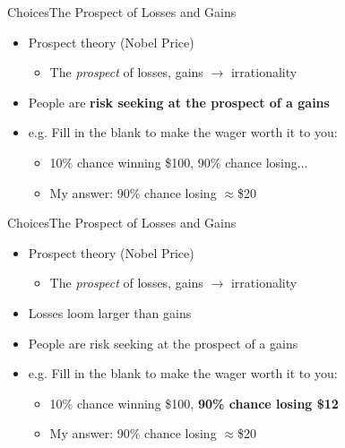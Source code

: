 \documentclass{beamer}
\begin{document}
\begin{frame}{Choices}{The Prospect of Losses and Gains}
  \begin{itemize}
  \addtolength{\itemsep}{0.5\baselineskip}
  \item Prospect theory (Nobel Price) 
        \begin{itemize}
        \item The {\it prospect} of losses, gains $\rightarrow$ irrationality
        \end{itemize}
  \item People are {\bf risk seeking at the prospect of a gains}
  \item e.g. Fill in the blank to make the wager worth it to you:
        \begin{itemize}
        \addtolength{\itemsep}{0.5\baselineskip}
        \item 10\% chance winning \$100, 90\% chance losing...
        \item My answer: 90\% chance losing $\approx$\$20
        \end{itemize}
  \end{itemize}

\end{frame}

\begin{frame}{Choices}{The Prospect of Losses and Gains}
  \begin{itemize}
  \addtolength{\itemsep}{0.5\baselineskip}
  \item Prospect theory (Nobel Price) 
        \begin{itemize}
        \item The {\it prospect} of losses, gains $\rightarrow$ irrationality
        \end{itemize}
  \item Losses loom larger than gains
  \item People are risk seeking at the prospect of a gains
  \item e.g. Fill in the blank to make the wager worth it to you:
        \begin{itemize}
        \addtolength{\itemsep}{0.5\baselineskip}
        \item 10\% chance winning \$100, {\bf 90\% chance losing \$12}
        \item My answer: 90\% chance losing $\approx$\$20
        \end{itemize}
  \end{itemize}

\end{frame}
\end{document}
